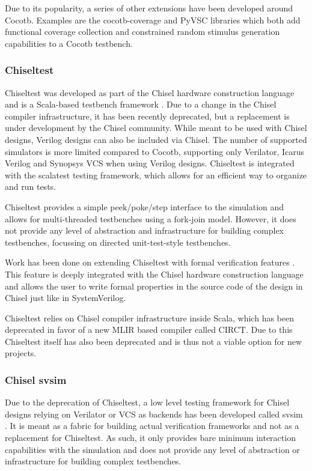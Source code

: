 Due to its popularity, a series of other extensions have been developed around Cocotb. Examples are the
cocotb-coverage \cite{crvpython} and PyVSC \cite{pyvsc} libraries which both add functional coverage collection and
constrained random stimulus generation capabilities to a Cocotb testbench.

\subsubsection{Chiseltest} %

Chiseltest was developed as part of the Chisel hardware construction language \cite{chiselpaper} and is a Scala-based testbench
framework \cite{chiseltest}. Due to a change in the Chisel compiler infrastructure, it has been recently deprecated,
but a replacement is under development by the Chisel community. While meant to be used with Chisel designs, Verilog
designs can also be included via Chisel. The number of supported simulators is more limited compared to Cocotb,
supporting only Verilator, Icarus Verilog and Synopsys VCS when using Verilog designs. Chiseltest is integrated with
the scalatest testing framework, which allows for an efficient way to organize and run tests.

Chiseltest provides a simple peek/poke/step interface to the simulation and allows for multi-threaded testbenches
using a fork-join model. However, it does not provide any
level of abstraction and infrastructure for building complex
testbenches, focussing on directed unit-test-style testbenches.

Work has been done on extending Chiseltest with formal verification features \cite{laeufer2021open}. This feature is
deeply integrated with the Chisel hardware construction language and allows the user to write formal properties in
the source code of the design in Chisel just like in SystemVerilog.

Chiseltest relies on Chisel compiler infrastructure inside Scala, which has been deprecated in favor of a new MLIR based compiler called CIRCT. Due to this Chiseltest itself has also been deprecated and is thus not a viable option for new projects.


\subsubsection{Chisel svsim}

Due to the deprecation of Chiseltest, a low level testing framework for Chisel designs relying on Verilator or VCS as backends has been developed called svsim \cite{svsim}. It is meant as a fabric for building actual verification frameworks and not as a replacement for Chiseltest. As such, it only provides bare minimum interaction capabilities with the simulation and does not provide any level of abstraction or infrastructure for building complex testbenches.


